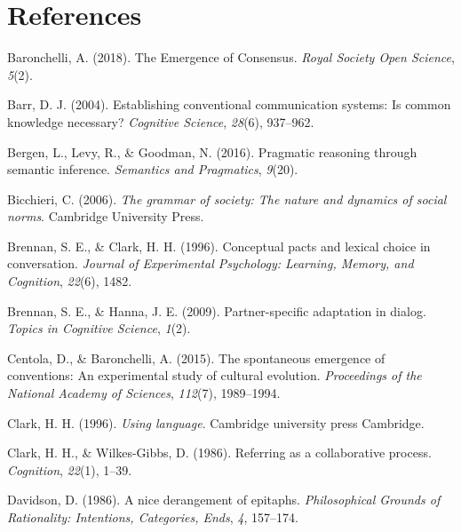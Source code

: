 \documentclass[10pt, letterpaper]{article}
\begin{document}
\hypertarget{references}{%
\section{References}\label{references}}

\setlength{\parindent}{-0.1in} 
\setlength{\leftskip}{0.125in}

\noindent

\hypertarget{refs}{}
\leavevmode\hypertarget{ref-baronchelli_emergence_2018}{}%
Baronchelli, A. (2018). The Emergence of Consensus. \emph{Royal Society
Open Science}, \emph{5}(2).

\leavevmode\hypertarget{ref-barr_establishing_2004}{}%
Barr, D. J. (2004). Establishing conventional communication systems: Is
common knowledge necessary? \emph{Cognitive Science}, \emph{28}(6),
937--962.

\leavevmode\hypertarget{ref-bergen_pragmatic_2016}{}%
Bergen, L., Levy, R., \& Goodman, N. (2016). Pragmatic reasoning through
semantic inference. \emph{Semantics and Pragmatics}, \emph{9}(20).

\leavevmode\hypertarget{ref-bicchieri_grammar_2006}{}%
Bicchieri, C. (2006). \emph{The grammar of society: The nature and
dynamics of social norms}. Cambridge University Press.

\leavevmode\hypertarget{ref-BrennanClark96_ConceptualPactsConversation}{}%
Brennan, S. E., \& Clark, H. H. (1996). Conceptual pacts and lexical
choice in conversation. \emph{Journal of Experimental Psychology:
Learning, Memory, and Cognition}, \emph{22}(6), 1482.

\leavevmode\hypertarget{ref-brennan_partner-specific_2009}{}%
Brennan, S. E., \& Hanna, J. E. (2009). Partner-specific adaptation in
dialog. \emph{Topics in Cognitive Science}, \emph{1}(2).

\leavevmode\hypertarget{ref-centola_spontaneous_2015}{}%
Centola, D., \& Baronchelli, A. (2015). The spontaneous emergence of
conventions: An experimental study of cultural evolution.
\emph{Proceedings of the National Academy of Sciences}, \emph{112}(7),
1989--1994.

\leavevmode\hypertarget{ref-clark_using_1996}{}%
Clark, H. H. (1996). \emph{Using language}. Cambridge university press
Cambridge.

\leavevmode\hypertarget{ref-clark_referring_1986}{}%
Clark, H. H., \& Wilkes-Gibbs, D. (1986). Referring as a collaborative
process. \emph{Cognition}, \emph{22}(1), 1--39.

\leavevmode\hypertarget{ref-davidson_nice_1986}{}%
Davidson, D. (1986). A nice derangement of epitaphs. \emph{Philosophical
Grounds of Rationality: Intentions, Categories, Ends}, \emph{4},
157--174.
\end{document}
